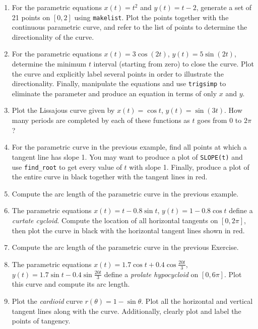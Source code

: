 \documentclass[10.5pt,twoside]{report}
\theoremstyle{definition}
\begin{document}
\begin{enumerate}

\item For the parametric equations $x(t)=t^2$ and $y(t)=t-2$, generate a set of 21 points on $[0,2]$ using \verb|makelist|.  Plot the points together with the continuous parametric curve, and refer to the list of points to determine the directionality of the curve.

\item For the parametric equations $x(t)=3\cos{(2t)}$, $y(t)=5\sin{(2t)}$, determine the minimum $t$ interval (starting from zero) to close the curve.  Plot the curve and explicitly label several points in order to illustrate the directionality.  Finally, manipulate the equations and use \verb|trigsimp| to eliminate the parameter and produce an equation in terms of only $x$ and $y$.

\item Plot the Lissajous curve given by $x(t)=\cos{t}$, $y(t)=\sin{(3t)}$.  How many periods are completed by each of these functions as $t$ goes from $0$ to $2\pi$?

\item  For the parametric curve in the previous example, find all points at which a tangent line has slope 1.  You may want to produce a plot of \verb|SLOPE(t)| and use \verb|find_root| to  get every value of $t$ with slope 1.  Finally, produce a plot of the entire curve in black together with the tangent lines in red.

\item Compute the arc length of the parametric curve in the previous example.

\item  The parametric equations $x(t)=t-0.8\sin{t}$, $y(t)=1-0.8\cos{t}$ define a \textit{curtate cycloid}.  Compute the location of all horizontal tangents on $[0,2\pi]$, then plot the curve in black with the horizontal tangent lines shown in red.

\item  Compute the arc length of the parametric curve in the previous Exercise.

\item  The parametric equations $x(t)=1.7\cos{t}+0.4\cos{\frac{20t}{3}}$, $y(t)=1.7\sin{t}-0.4\sin{\frac{20t}{3}}$ define a \textit{prolate hypocycloid} on $[0,6\pi]$.  Plot this curve and compute its arc length.

\item  Plot the \textit{cardioid} curve $r(\theta)=1-\sin{\theta}$.  Plot all the horizontal and vertical tangent lines along with the curve.  Additionally, clearly plot and label the points of tangency.


\end{enumerate}
\end{document}
